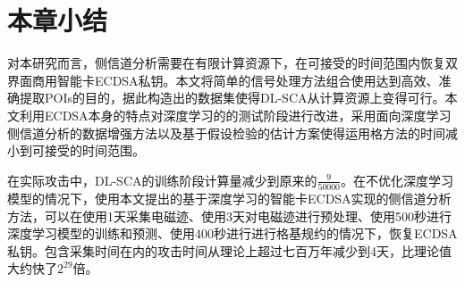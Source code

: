{	\section{本章小结}
	对本研究而言，侧信道分析需要在有限计算资源下，在可接受的时间范围内恢复双界面商用智能卡ECDSA私钥。本文将简单的信号处理方法组合使用达到高效、准确提取POIs的目的，据此构造出的数据集使得DL-SCA从计算资源上变得可行。本文利用ECDSA本身的特点对深度学习的的测试阶段进行改进，采用面向深度学习侧信道分析的数据增强方法以及基于假设检验的估计方案使得运用格方法的时间减小到可接受的时间范围。
	
	在实际攻击中，DL-SCA的训练阶段计算量减少到原来的$\frac{9}{50000}$。在不优化深度学习模型的情况下，使用本文提出的基于深度学习的智能卡ECDSA实现的侧信道分析方法，可以在使用1天采集电磁迹、使用3天对电磁迹进行预处理、使用500秒进行深度学习模型的训练和预测、使用400秒进行进行格基规约的情况下，恢复ECDSA私钥。包含采集时间在内的攻击时间从理论上超过七百万年减少到4天，比理论值大约快了$2^{29}$倍。
}